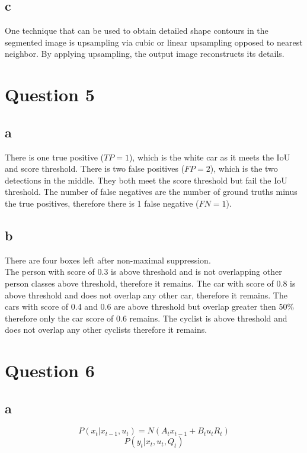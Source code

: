 \documentclass[12pt]{article}
\begin{document}
\subsection{c}
One technique that can be used to obtain detailed shape contours in the segmented image is upsampling via cubic or linear upsampling opposed to nearest neighbor. By applying upsampling, the output image reconstructs its details.

\section{Question 5}
\subsection{a}
There is one true positive ($TP=1$), which is the white car as it meets the IoU and score threshold.
There is two false positives ($FP=2$), which is the two detections in the middle. They both meet the score threshold but fail the IoU threshold.
The number of false negatives are the number of ground truths minus the true positives, therefore there is 1 false negative ($FN=1$).


\subsection{b}
There are four boxes left after non-maximal suppression. \\
The person with score of 0.3 is above threshold and is not overlapping other person classes above threshold, therefore it remains.
The car with score of 0.8 is above threshold and does not overlap any other car, therefore it remains.
The cars with score of 0.4 and 0.6 are above threshold but overlap greater then 50\% therefore only the car score of 0.6 remains.
The cyclist is above threshold and does not overlap any other cyclists therefore it remains.

\section{Question 6}
\subsection{a}
\begin{equation*}
    P(x_t | x_{t-1}, u_t) = N(A_tx_{t-1} + B_tu_tR_t)
\end{equation*}
\begin{equation*}
    P(y_t|x_t,u_t, Q_t)
\end{equation*}
\end{document}
